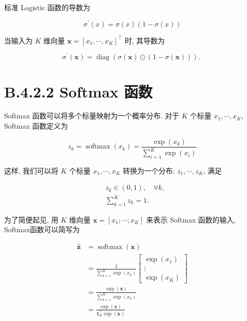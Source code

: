 \documentclass[10pt]{article}
\begin{document}
标准 Logistic 函数的导数为


\begin{equation*}
\sigma^{\prime}(x)=\sigma(x)(1-\sigma(x)) \tag{B.30}
\end{equation*}


当输入为 $K$ 维向量 $\boldsymbol{x}=\left[x_{1}, \cdots, x_{K}\right]^{\top}$ 时, 其导数为


\begin{equation*}
\sigma^{\prime}(\boldsymbol{x})=\operatorname{diag}(\sigma(\boldsymbol{x}) \odot(1-\sigma(\boldsymbol{x}))) \text {. } \tag{B.31}
\end{equation*}


\section*{B.4.2.2 Softmax 函数}
Softmax 函数可以将多个标量映射为一个概率分布. 对于 $K$ 个标量 $x_{1}, \cdots, x_{K}$, Softmax 函数定义为


\begin{equation*}
z_{k}=\operatorname{softmax}\left(x_{k}\right)=\frac{\exp \left(x_{k}\right)}{\sum_{i=1}^{K} \exp \left(x_{i}\right)} \tag{B.32}
\end{equation*}


这样, 我们可以将 $K$ 个标量 $x_{1}, \cdots, x_{K}$ 转换为一个分布: $z_{1}, \cdots, z_{K}$, 满足


\begin{align*}
& z_{k} \in(0,1), \quad \forall k,  \tag{B.33}\\
& \sum_{k=1}^{K} z_{k}=1 . \tag{B.34}
\end{align*}


为了简便起见, 用 $K$ 维向量 $\boldsymbol{x}=\left[x_{1} ; \cdots ; x_{K}\right]$ 来表示 Softmax 函数的输入, Softmax函数可以简写为


\begin{align*}
\hat{\boldsymbol{z}} & =\operatorname{softmax}(\boldsymbol{x})  \tag{B.35}\\
& =\frac{1}{\sum_{k=1}^{K} \exp \left(x_{k}\right)}\left[\begin{array}{c}
\exp \left(x_{1}\right) \\
\vdots \\
\exp \left(x_{K}\right)
\end{array}\right]  \tag{B.36}\\
& =\frac{\exp (\boldsymbol{x})}{\sum_{k=1}^{K} \exp \left(x_{k}\right)}  \tag{B.37}\\
& =\frac{\exp (\boldsymbol{x})}{\mathbf{1}_{K}^{\top} \exp (\boldsymbol{x})} \tag{B.38}
\end{align*}
\end{document}
